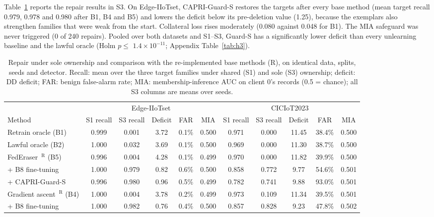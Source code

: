 \documentclass[pdflatex,sn-mathphys-num,iicol]{sn-jnl}
\begin{document}
Table~\ref{tab:basecmp} reports the repair results in S3. On Edge-IIoTset, CAPRI-Guard-S restores the targets after every base method (mean target recall 0.979, 0.978 and 0.980 after B1, B4 and B5) and lowers the deficit below its pre-deletion value (1.25), because the exemplars also strengthen families that were weak from the start. Collateral loss rises moderately (0.080 against 0.048 for B1). The MIA safeguard was never triggered (0 of 240 repairs). Pooled over both datasets and S1--S3, Guard-S has a significantly lower deficit than every unlearning baseline and the lawful oracle (Holm $p\le$ $1.4\times10^{-11}$; Appendix Table~\ref{tab:h3}).



\begin{table}[t]
\caption{Repair under sole ownership and comparison with the re-implemented base methods (R), on identical data, splits, seeds and detector. Recall: mean over the three target families under shared (S1) and sole (S3) ownership; deficit: DD deficit; FAR: benign false-alarm rate; MIA: membership-inference AUC on client 0's records (0.5 = chance); all S3 columns are means over seeds.}\label{tab:basecmp}
\scriptsize
\setlength{\tabcolsep}{1.5pt}
\begin{tabular*}{\textwidth}{@{\extracolsep\fill}lcccccccccc@{}}
\toprule
 & \multicolumn{5}{c}{Edge-IIoTset} & \multicolumn{5}{c}{CICIoT2023} \\
\cmidrule(lr){2-6}\cmidrule(lr){7-11}
Method & S1 recall & S3 recall & Deficit & FAR & MIA & S1 recall & S3 recall & Deficit & FAR & MIA \\
\midrule
Retrain oracle (B1) & 0.999 & 0.001 & 3.72 & 0.1\% & 0.500 & 0.971 & 0.000 & 11.45 & 38.4\% & 0.500 \\
Lawful oracle (B2) & 1.000 & 0.032 & 3.69 & 0.1\% & 0.500 & 0.969 & 0.000 & 11.30 & 38.7\% & 0.500 \\
FedEraser~\cite{liu2021federaser}$^{\mathrm{R}}$ (B5) & 0.996 & 0.004 & 4.28 & 0.1\% & 0.499 & 0.970 & 0.000 & 11.82 & 39.9\% & 0.500 \\
\quad + B8 fine-tuning & 1.000 & 0.979 & 0.82 & 0.6\% & 0.500 & 0.858 & 0.772 & 9.77 & 54.6\% & 0.501 \\
\quad + CAPRI-Guard-S & 0.996 & 0.980 & 0.96 & 0.5\% & 0.499 & 0.782 & 0.741 & 9.88 & 93.0\% & 0.501 \\
Gradient ascent~\cite{halimi2022}$^{\mathrm{R}}$ (B4) & 1.000 & 0.004 & 3.78 & 0.2\% & 0.499 & 0.973 & 0.109 & 11.34 & 39.5\% & 0.501 \\
\quad + B8 fine-tuning & 1.000 & 0.982 & 0.76 & 0.4\% & 0.500 & 0.857 & 0.828 & 9.23 & 47.8\% & 0.502 \\

\end{tabular*}
\end{table}
\end{document}
